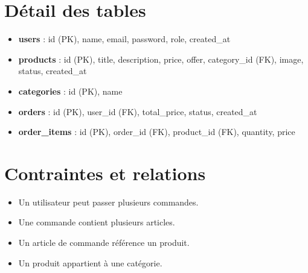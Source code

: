 \documentclass[a4paper,12pt]{article}
\begin{document}
\section*{Détail des tables}
\begin{itemize}
  \item \textbf{users} : id (PK), name, email, password, role, created\_at
  \item \textbf{products} : id (PK), title, description, price, offer, category\_id (FK), image, status, created\_at
  \item \textbf{categories} : id (PK), name
  \item \textbf{orders} : id (PK), user\_id (FK), total\_price, status, created\_at
  \item \textbf{order\_items} : id (PK), order\_id (FK), product\_id (FK), quantity, price
\end{itemize}

\section*{Contraintes et relations}
\begin{itemize}
  \item Un utilisateur peut passer plusieurs commandes.
  \item Une commande contient plusieurs articles.
  \item Un article de commande référence un produit.
  \item Un produit appartient à une catégorie.
\end{itemize}
\end{document}
